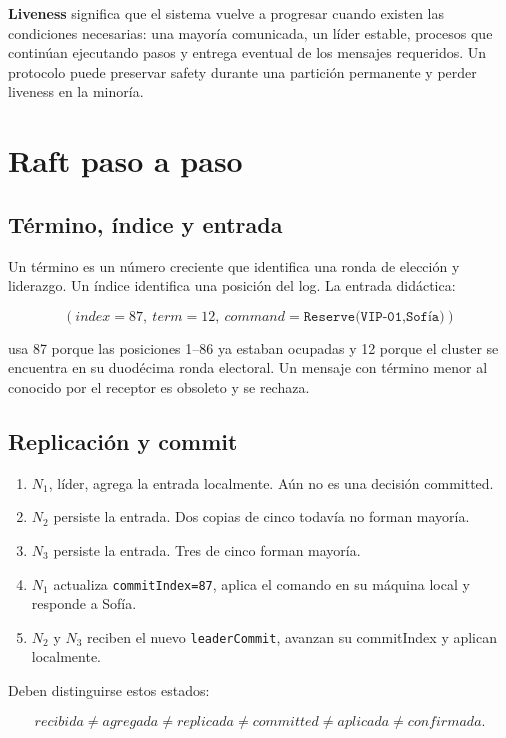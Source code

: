 \documentclass[variant=apuntes,cover=institutional,mode=screen]{ua-engineering-v6-article}
\begin{document}
\textbf{Liveness} significa que el sistema vuelve a progresar cuando existen las condiciones necesarias: una mayoría comunicada, un líder estable, procesos que continúan ejecutando pasos y entrega eventual de los mensajes requeridos. Un protocolo puede preservar safety durante una partición permanente y perder liveness en la minoría.

\section{Raft paso a paso}

\subsection{Término, índice y entrada}

Un término es un número creciente que identifica una ronda de elección y liderazgo. Un índice identifica una posición del log. La entrada didáctica:

\[
(\textit{index}=87,\ \textit{term}=12,\ \textit{command}=\texttt{Reserve(VIP-01,Sofía)})
\]

usa 87 porque las posiciones 1--86 ya estaban ocupadas y 12 porque el cluster se encuentra en su duodécima ronda electoral. Un mensaje con término menor al conocido por el receptor es obsoleto y se rechaza.

\subsection{Replicación y commit}

\begin{enumerate}
\item \(N_1\), líder, agrega la entrada localmente. Aún no es una decisión committed.
\item \(N_2\) persiste la entrada. Dos copias de cinco todavía no forman mayoría.
\item \(N_3\) persiste la entrada. Tres de cinco forman mayoría.
\item \(N_1\) actualiza \texttt{commitIndex=87}, aplica el comando en su máquina local y responde a Sofía.
\item \(N_2\) y \(N_3\) reciben el nuevo \texttt{leaderCommit}, avanzan su commitIndex y aplican localmente.
\end{enumerate}

Deben distinguirse estos estados:

\[
recibida\neq agregada\neq replicada\neq committed\neq aplicada\neq confirmada.
\]
\end{document}
